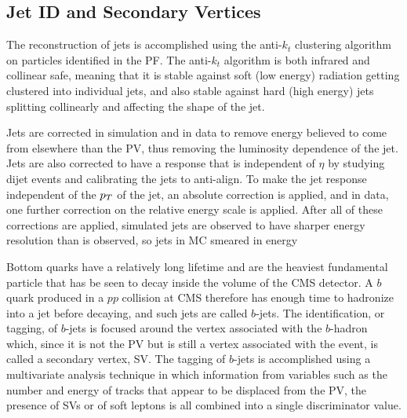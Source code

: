 
\subsection{Jet ID and Secondary Vertices}
 The reconstruction
  of jets is accomplished using the anti-$k_t$
  clustering algorithm on particles identified 
  in the PF.
 The anti-$k_t$ algorithm is both infrared and collinear
  safe, meaning that it is stable against 
  soft (low energy) radiation getting clustered into individual jets, and 
  also stable against hard (high energy) jets splitting
  collinearly and affecting the shape of the jet.
 
 Jets are corrected in simulation and in data to remove
  energy believed to come from elsewhere than the PV,
  thus removing the luminosity dependence of the jet.
 Jets are also corrected to have a response that is
  independent of $\eta$ by studying dijet events
  and calibrating the jets to anti-align.
 To make the jet response independent of the $p_T$
  of the jet, an absolute correction is applied,
  and in data, one further correction on the relative
  energy scale is applied.
 After all of these corrections are applied, 
  simulated jets are observed to have
  sharper energy resolution than is observed,
  so jets in MC smeared in energy

 Bottom quarks have a relatively long lifetime 
  and are the heaviest fundamental particle
  that has be seen to decay inside the volume of the CMS detector.
 A $b$ quark produced in a $pp$ collision at CMS
  therefore has enough time to hadronize into a jet before
  decaying, and such jets are called $b$-jets.
 The identification, or tagging, of $b$-jets is focused around
  the vertex associated with the $b$-hadron which,
  since it is not the PV but is still a vertex associated
  with the event, is called a secondary vertex, SV.
 The tagging of $b$-jets is accomplished using a multivariate
  analysis technique in which information from variables
  such as the number and energy of tracks that appear to
  be displaced from the PV, the presence of SVs or of
  soft leptons is all combined into a single discriminator value.
  
 
